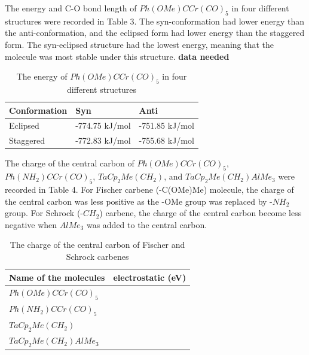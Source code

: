 \documentclass[twocolumn]{article} %
\begin{document}
The energy and C-O bond length of $Ph(OMe)CCr(CO)_5$ in four different structures were recorded in Table 3. The syn-conformation had lower energy than the anti-conformation, and the eclipsed form had lower energy than the staggered form. The syn-eclipsed structure had the lowest energy, meaning that the molecule was most stable under this structure. \textbf{data needed}

\begin{table}[h]
\caption{The energy of  $Ph(OMe)CCr(CO)_5$ in four different structures}
\begin{tabular}{L{1.0in}C{1.0in}C{1.0in}}\toprule
Conformation & Syn     & Anti    \\ \hline
Eclipsed     & -774.75 kJ/mol & -751.85 kJ/mol\\
Staggered    & -772.83 kJ/mol & -755.68 kJ/mol \\\bottomrule
\end{tabular}
\end{table}

The charge of the central carbon of $Ph(OMe)CCr(CO)_5$, $Ph(NH_2)CCr(CO)_5$, $TaCp_2Me(CH_2)$, and $TaCp_2Me(CH_2)AlMe_3$ were recorded in Table 4. For Fischer carbene (-C(OMe)Me) molecule, the charge of the central carbon was less positive as the -OMe group was replaced by -$NH_2$ group. For Schrock (-$CH_2$) carbene, the charge of the central carbon become less negative when $AlMe_3$ was added to the central carbon. 

\begin{table}[h]
\caption{The charge of the central carbon of Fischer and Schrock carbenes}
\begin{tabular}{L{1.5in}C{1.5in}}\toprule
Name of the molecules  & electrostatic (eV)    \\ \hline
$Ph(OMe)CCr(CO)_5$    &  \\
$Ph(NH_2)CCr(CO)_5$     &  \\
$TaCp_2Me(CH_2)$     &  \\
$TaCp_2Me(CH_2)AlMe_3$ & \\\bottomrule
\end{tabular}
\end{table}





\end{document}
